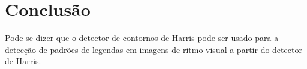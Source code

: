 \documentclass[10pt,a4paper]{article}
\begin{document}
\section{Conclusão}
Pode-se dizer que o detector de contornos de Harris pode 
ser usado para a detecção de padrões de legendas em imagens de ritmo visual a
partir do detector de Harris.


\begin{small}
  
\end{small}
\end{document}
